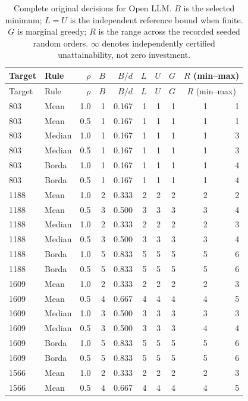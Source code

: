 \documentclass{article}
\begin{document}
\begin{longtable}{llrrr rr r rr}
\caption{Complete original decisions for Open LLM. $B$ is the selected minimum; $L=U$ is the independent reference bound when finite. $G$ is marginal greedy; $R$ is the range across the recorded seeded random orders. $\infty$ denotes independently certified unattainability, not zero investment.}\\
\toprule
Target & Rule & $\rho$ & $B$ & $B/d$ & $L$ & $U$ & $G$ & \multicolumn{2}{c}{$R$ (min--max)} \\
\midrule\endfirsthead
\toprule Target & Rule & $\rho$ & $B$ & $B/d$ & $L$ & $U$ & $G$ & \multicolumn{2}{c}{$R$ (min--max)} \\ \midrule\endhead
803 & Mean & 1.0 & 1 & 0.167 & 1 & 1 & 1 & 1 & 1 \\
803 & Mean & 0.5 & 1 & 0.167 & 1 & 1 & 1 & 1 & 1 \\
803 & Median & 1.0 & 1 & 0.167 & 1 & 1 & 1 & 1 & 3 \\
803 & Median & 0.5 & 1 & 0.167 & 1 & 1 & 1 & 1 & 3 \\
803 & Borda & 1.0 & 1 & 0.167 & 1 & 1 & 1 & 1 & 4 \\
803 & Borda & 0.5 & 1 & 0.167 & 1 & 1 & 1 & 1 & 4 \\
1188 & Mean & 1.0 & 2 & 0.333 & 2 & 2 & 2 & 2 & 2 \\
1188 & Mean & 0.5 & 3 & 0.500 & 3 & 3 & 3 & 3 & 4 \\
1188 & Median & 1.0 & 2 & 0.333 & 2 & 2 & 2 & 2 & 3 \\
1188 & Median & 0.5 & 3 & 0.500 & 3 & 3 & 3 & 3 & 4 \\
1188 & Borda & 1.0 & 5 & 0.833 & 5 & 5 & 5 & 5 & 6 \\
1188 & Borda & 0.5 & 5 & 0.833 & 5 & 5 & 5 & 5 & 6 \\
1609 & Mean & 1.0 & 2 & 0.333 & 2 & 2 & 2 & 2 & 3 \\
1609 & Mean & 0.5 & 4 & 0.667 & 4 & 4 & 4 & 4 & 5 \\
1609 & Median & 1.0 & 3 & 0.500 & 3 & 3 & 3 & 3 & 3 \\
1609 & Median & 0.5 & 3 & 0.500 & 3 & 3 & 3 & 4 & 4 \\
1609 & Borda & 1.0 & 5 & 0.833 & 5 & 5 & 5 & 5 & 6 \\
1609 & Borda & 0.5 & 5 & 0.833 & 5 & 5 & 5 & 5 & 6 \\
1566 & Mean & 1.0 & 2 & 0.333 & 2 & 2 & 2 & 2 & 3 \\
1566 & Mean & 0.5 & 4 & 0.667 & 4 & 4 & 4 & 4 & 5 \\

\end{longtable}
\end{document}
